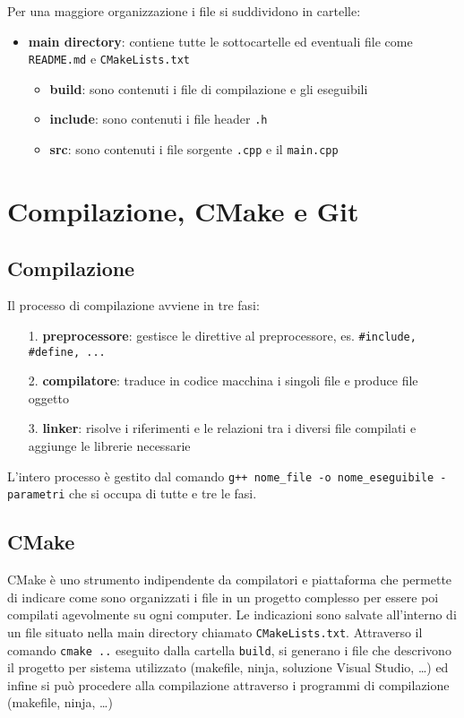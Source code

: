\documentclass[a4paper]{article}
\begin{document}
Per una maggiore organizzazione i file si suddividono in cartelle:
\begin{itemize}
	\item \textbf{main directory}: contiene tutte le sottocartelle ed eventuali file come \verb|README.md| e \verb|CMakeLists.txt|
	\begin{itemize}[topsep=0pt]
		\item \textbf{build}: sono contenuti i file di compilazione e gli eseguibili
		\item \textbf{include}: sono contenuti i file header \verb|.h|
		\item \textbf{src}: sono contenuti i file sorgente \verb|.cpp| e il \verb|main.cpp|
	\end{itemize}
\end{itemize}

\section{Compilazione, CMake e Git}
\subsection{Compilazione}
Il processo di compilazione avviene in tre fasi:
\begin{itemize}
	\item[1.] \textbf{preprocessore}: gestisce le direttive al preprocessore, es. \verb|#include, #define, ...|
	\item[2.] \textbf{compilatore}: traduce in codice macchina i singoli file e produce file oggetto
	\item[3.] \textbf{linker}: risolve i riferimenti e le relazioni tra i diversi file compilati e aggiunge le librerie necessarie
\end{itemize}
L'intero processo è gestito dal comando \verb|g++ nome_file -o nome_eseguibile -parametri| che si occupa di tutte e tre le fasi.

\subsection{CMake}
CMake è uno strumento indipendente da compilatori e piattaforma che permette di indicare come sono organizzati i file in un
progetto complesso per essere poi compilati agevolmente su ogni computer. Le indicazioni sono salvate all'interno di un file
situato nella main directory chiamato \verb|CMakeLists.txt|. Attraverso il comando \verb|cmake ..| eseguito dalla cartella
\verb|build|, si generano i file che descrivono il progetto per sistema utilizzato (makefile, ninja, soluzione Visual Studio,
\dots) ed infine si può procedere alla compilazione attraverso i programmi di compilazione (makefile, ninja, \dots)
\end{document}
